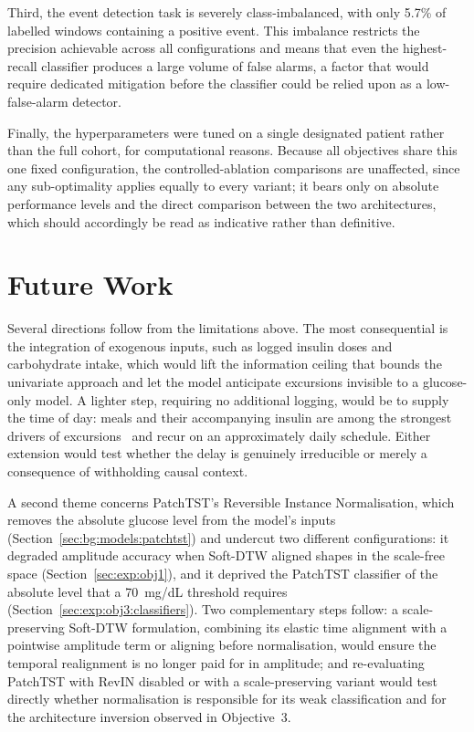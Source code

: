 Third, the event detection task is severely class-imbalanced, with only 5.7\% of labelled windows containing a positive event. This imbalance restricts the precision achievable across all configurations and means that even the highest-recall classifier produces a large volume of false alarms, a factor that would require dedicated mitigation before the classifier could be relied upon as a low-false-alarm detector.

Finally, the hyperparameters were tuned on a single designated patient rather than the full cohort, for computational reasons. Because all objectives share this one fixed configuration, the controlled-ablation comparisons are unaffected, since any sub-optimality applies equally to every variant; it bears only on absolute performance levels and the direct comparison between the two architectures, which should accordingly be read as indicative rather than definitive.

\section{Future Work}
\label{sec:conc:futurework}

Several directions follow from the limitations above. The most consequential is the integration of exogenous inputs, such as logged insulin doses and carbohydrate intake, which would lift the information ceiling that bounds the univariate approach and let the model anticipate excursions invisible to a glucose-only model. A lighter step, requiring no additional logging, would be to supply the time of day: meals and their accompanying insulin are among the strongest drivers of excursions~\citep{sun2026futureaware} and recur on an approximately daily schedule. Either extension would test whether the delay is genuinely irreducible or merely a consequence of withholding causal context.

A second theme concerns PatchTST's Reversible Instance Normalisation, which removes the absolute glucose level from the model's inputs (Section~\ref{sec:bg:models:patchtst}) and undercut two different configurations: it degraded amplitude accuracy when Soft-DTW aligned shapes in the scale-free space (Section~\ref{sec:exp:obj1}), and it deprived the PatchTST classifier of the absolute level that a 70~mg/dL threshold requires (Section~\ref{sec:exp:obj3:classifiers}). Two complementary steps follow: a scale-preserving Soft-DTW formulation, combining its elastic time alignment with a pointwise amplitude term or aligning before normalisation, would ensure the temporal realignment is no longer paid for in amplitude; and re-evaluating PatchTST with RevIN disabled or with a scale-preserving variant would test directly whether normalisation is responsible for its weak classification and for the architecture inversion observed in Objective~3.

